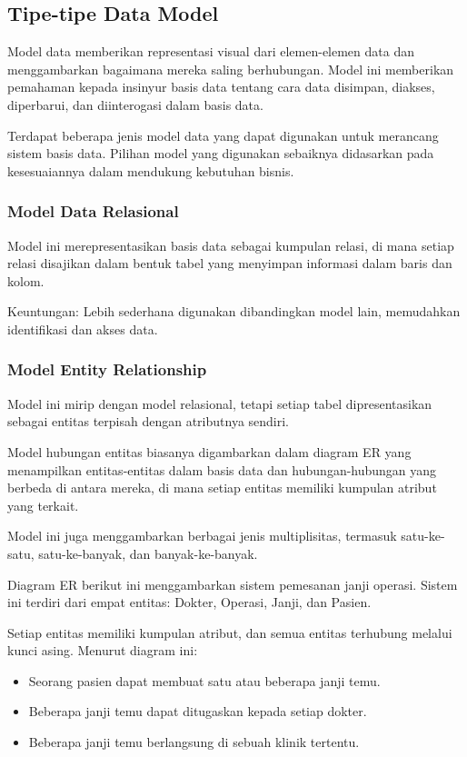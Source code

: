 \documentclass{article}
\begin{document}
\subsection{Tipe-tipe Data Model}
Model data memberikan representasi visual dari elemen-elemen data dan menggambarkan bagaimana mereka saling berhubungan. Model ini memberikan pemahaman kepada insinyur basis data tentang cara data disimpan, diakses, diperbarui, dan diinterogasi dalam basis data.

Terdapat beberapa jenis model data yang dapat digunakan untuk merancang sistem basis data. Pilihan model yang digunakan sebaiknya didasarkan pada kesesuaiannya dalam mendukung kebutuhan bisnis.

\subsubsection{Model Data Relasional}
Model ini merepresentasikan basis data sebagai kumpulan relasi, di mana setiap relasi disajikan dalam bentuk tabel yang menyimpan informasi dalam baris dan kolom.

Keuntungan: Lebih sederhana digunakan dibandingkan model lain, memudahkan identifikasi dan akses data.

\subsubsection{Model Entity Relationship}
Model ini mirip dengan model relasional, tetapi setiap tabel dipresentasikan sebagai entitas terpisah dengan atributnya sendiri.

Model hubungan entitas biasanya digambarkan dalam diagram ER yang menampilkan entitas-entitas dalam basis data dan hubungan-hubungan yang berbeda di antara mereka, di mana setiap entitas memiliki kumpulan atribut yang terkait.

Model ini juga menggambarkan berbagai jenis multiplisitas, termasuk satu-ke-satu, satu-ke-banyak, dan banyak-ke-banyak.

Diagram ER berikut ini menggambarkan sistem pemesanan janji operasi. Sistem ini terdiri dari empat entitas: Dokter, Operasi, Janji, dan Pasien.

Setiap entitas memiliki kumpulan atribut, dan semua entitas terhubung melalui kunci asing. Menurut diagram ini:
\begin{itemize}
    \item Seorang pasien dapat membuat satu atau beberapa janji temu.
    \item Beberapa janji temu dapat ditugaskan kepada setiap dokter.
    \item Beberapa janji temu berlangsung di sebuah klinik tertentu.
\end{itemize}
\end{document}
